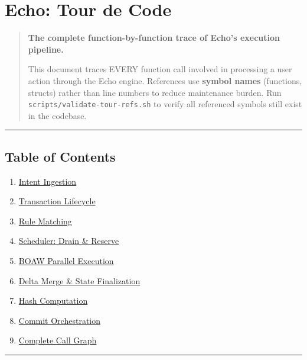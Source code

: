 \documentclass[
]{book}
\author{}
\date{}
\providecommand{\tightlist}{%
  \setlength{\itemsep}{0pt}\setlength{\parskip}{0pt}}
\begin{document}
\frontmatter

\mainmatter
\chapter{Echo: Tour de Code}\label{echo-tour-de-code}

\begin{quote}
\textbf{The complete function-by-function trace of Echo's execution
pipeline.}

This document traces EVERY function call involved in processing a user
action through the Echo engine. References use \textbf{symbol names}
(functions, structs) rather than line numbers to reduce maintenance burden.
Run \texttt{scripts/validate-tour-refs.sh} to verify all referenced symbols
still exist in the codebase.
\end{quote}

\begin{center}\rule{0.5\linewidth}{0.5pt}\end{center}

\section{Table of Contents}\label{table-of-contents}

\begin{enumerate}
\def\labelenumi{\arabic{enumi}.}
\tightlist
\item
  \hyperref[1-intent-ingestion]{Intent Ingestion}
\item
  \hyperref[2-transaction-lifecycle]{Transaction Lifecycle}
\item
  \hyperref[3-rule-matching]{Rule Matching}
\item
  \hyperref[4-scheduler-drain--reserve]{Scheduler: Drain \& Reserve}
\item
  \hyperref[5-boaw-parallel-execution]{BOAW Parallel Execution}
\item
  \hyperref[6-delta-merge--state-finalization]{Delta Merge \& State
  Finalization}
\item
  \hyperref[7-hash-computation]{Hash Computation}
\item
  \hyperref[8-commit-orchestration]{Commit Orchestration}
\item
  \hyperref[9-complete-call-graph]{Complete Call Graph}
\end{enumerate}

\begin{center}\rule{0.5\linewidth}{0.5pt}\end{center}
\end{document}
